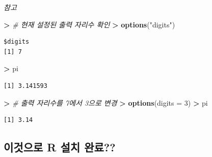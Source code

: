 \documentclass[12pt,a4paper]{book}
\newenvironment{Shaded}{\begin{snugshade}}{\end{snugshade}}
\newcommand{\KeywordTok}[1]{\textcolor[rgb]{0.13,0.29,0.53}{\textbf{#1}}}
\newcommand{\DataTypeTok}[1]{\textcolor[rgb]{0.13,0.29,0.53}{#1}}
\newcommand{\DecValTok}[1]{\textcolor[rgb]{0.00,0.00,0.81}{#1}}
\newcommand{\StringTok}[1]{\textcolor[rgb]{0.31,0.60,0.02}{#1}}
\newcommand{\CommentTok}[1]{\textcolor[rgb]{0.56,0.35,0.01}{\textit{#1}}}
\newcommand{\OperatorTok}[1]{\textcolor[rgb]{0.81,0.36,0.00}{\textbf{#1}}}
\newcommand{\ErrorTok}[1]{\textcolor[rgb]{0.64,0.00,0.00}{\textbf{#1}}}
\newcommand{\NormalTok}[1]{#1}
\theoremstyle{definition}
\theoremstyle{definition}
\theoremstyle{definition}
\theoremstyle{remark}
\begin{document}
\emph{참고}

\begin{Shaded}
\begin{Highlighting}[]
\OperatorTok{>}\StringTok{ }\CommentTok{# 현재 설정된 출력 자리수 확인}
\ErrorTok{>}\StringTok{ }\KeywordTok{options}\NormalTok{(}\StringTok{"digits"}\NormalTok{)}
\end{Highlighting}
\end{Shaded}

\begin{verbatim}
$digits
[1] 7
\end{verbatim}

\begin{Shaded}
\begin{Highlighting}[]
\OperatorTok{>}\StringTok{ }\NormalTok{pi}
\end{Highlighting}
\end{Shaded}

\begin{verbatim}
[1] 3.141593
\end{verbatim}

\begin{Shaded}
\begin{Highlighting}[]
\OperatorTok{>}\StringTok{ }\CommentTok{# 출력 자리수를 7에서 3으로 변경}
\ErrorTok{>}\StringTok{ }\KeywordTok{options}\NormalTok{(}\DataTypeTok{digits =} \DecValTok{3}\NormalTok{)}
\OperatorTok{>}\StringTok{ }\NormalTok{pi}
\end{Highlighting}
\end{Shaded}

\begin{verbatim}
[1] 3.14
\end{verbatim}

\subsection{이것으로 R 설치 완료??}\label{-r--}
\end{document}
